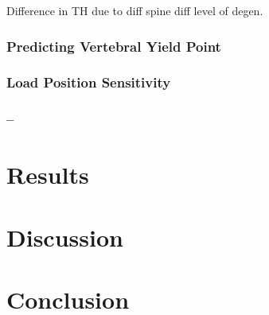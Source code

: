 Difference in TH due to diff spine diff level of degen.


\subsubsection{Predicting Vertebral Yield Point}\label{predYield}

\subsubsection{Load Position Sensitivity}


\subsubsection{--}

\section{Results}

\section{Discussion}

\section{Conclusion}








